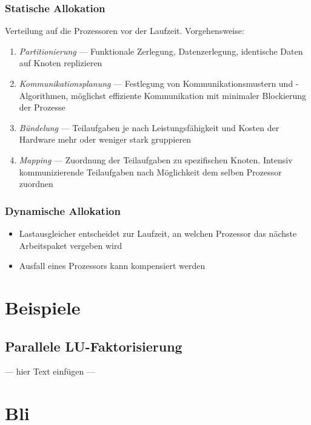 \documentclass[a4paper, 12pt]{article}
\begin{document}
\subsubsection*{Statische Allokation}
Verteilung auf die Prozessoren vor der Laufzeit. Vorgehensweise:
\begin{enumerate}
  \item \emph{Partitionierung} --- Funktionale Zerlegung, Datenzerlegung, identische Daten auf Knoten replizieren
  \item \emph{Kommunikationsplanung} --- Festlegung von Kommunikationsmustern und -Algorithmen, möglichst effiziente Kommunikation mit minimaler Blockierung der Prozesse
  \item \emph{Bündelung} --- Teilaufgaben je nach Leistungsfähigkeit und Kosten der Hardware mehr oder weniger stark gruppieren
  \item \emph{Mapping} --- Zuordnung der Teilaufgaben zu spezifischen Knoten. Intensiv kommunizierende Teilaufgaben nach Möglichkeit dem selben Prozessor zuordnen
\end{enumerate}

\subsubsection*{Dynamische Allokation}
\begin{itemize}
  \item Lastausgleicher entscheidet zur Laufzeit, an welchen Prozessor das nächste Arbeitspaket vergeben wird
  \item Ausfall eines Prozessors kann kompensiert werden
\end{itemize}



\section{Beispiele}


\subsection{Parallele LU-Faktorisierung}
--- hier Text einfügen ---









\section{Bli}
\end{document}
